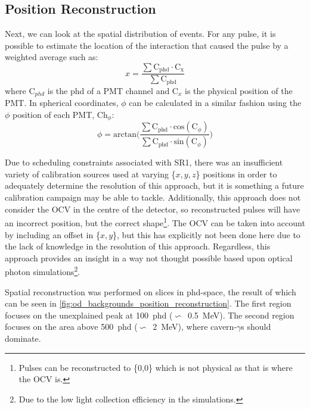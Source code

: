 



\subsection{Position Reconstruction}
\par
Next, we can look at the spatial distribution of events.
For any pulse, it is possible to estimate the location of the interaction that caused the pulse by a weighted average such as:
\begin{equation}
    x = \frac{\sum{\text{C}_{\text{phd}} \cdot \text{C}_\text{x}}}{\sum{\text{C}_\text{phd}}} 
\label{eq:OD_xy_position}
\end{equation}
where C$_{phd}$ is the phd of a PMT channel and C$_{x}$ is the physical position of the PMT.
In spherical coordinates, $\phi$ can be calculated in a similar fashion using the $\phi$ position of each PMT, Ch$_\phi$:
\begin{equation}
    \phi = \text{arctan}\bigg( \frac{\sum{\text{C}_\text{phd} \cdot \text{cos}(\text{C}_{\phi})}}{\sum{\text{C}_\text{phd} \cdot \text{sin}(\text{C}_{\phi})}} \bigg)
\label{eq:OD_phi_position}
\end{equation}
\par
Due to scheduling constraints associated with SR1, there was an insufficient variety of calibration sources used at varying \{$x,y,z$\} positions in order to adequately determine the resolution of this approach, but it is something a future calibration campaign may be able to tackle. 
Additionally, this approach does not consider the OCV in the centre of the detector, so reconstructed pulses will have an incorrect position, but the correct shape\footnote{Pulses can be reconstructed to \{0,0\} which is not physical as that is where the OCV is.}.
The OCV can be taken into account by including an offset in \{$x,y$\}, but this has explicitly not been done here due to the lack of knowledge in the resolution of this approach.
Regardless, this approach provides an insight in a way not thought possible based upon optical photon simulations\footnote{Due to the low light collection efficiency in the simulations.}.

\par
Spatial reconstruction was performed on slices in phd-space, the result of which can be seen in \autoref{fig:od_backgrounds_position_reconstruction}.
The first region focuses on the unexplained peak at 100~phd ($\backsim$~0.5~MeV).
The second region focuses on the area above 500~phd ($\backsim$~2~MeV), where cavern-$\gamma$s should dominate.

